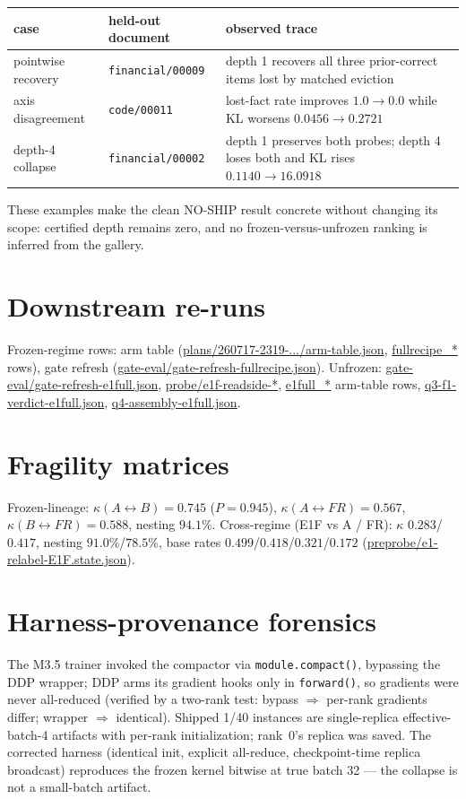 \documentclass[11pt]{article}
\begin{document}
\begin{center}
\small
\begin{tabularx}{\linewidth}{@{}llX@{}}
\toprule
case & held-out document & observed trace \\
\midrule
pointwise recovery & \texttt{financial/00009} & depth 1 recovers all three prior-correct items lost by matched eviction \\
axis disagreement & \texttt{code/00011} & lost-fact rate improves $1.0\to0.0$ while KL worsens $0.0456\to0.2721$ \\
depth-4 collapse & \texttt{financial/00002} & depth 1 preserves both probes; depth 4 loses both and KL rises $0.1140\to16.0918$ \\
\bottomrule
\end{tabularx}
\end{center}

These examples make the clean NO-SHIP result concrete without changing its
scope: certified depth remains zero, and no frozen-versus-unfrozen ranking is
inferred from the gallery.

\section{Downstream re-runs}
Frozen-regime rows: arm table
(\url{plans/260717-2319-.../arm-table.json}, \url{fullrecipe_*}
rows), gate refresh
(\url{gate-eval/gate-refresh-fullrecipe.json}). Unfrozen: \url{gate-eval/gate-refresh-e1full.json},
\url{probe/e1f-readside-*}, \url{e1full_*} arm-table rows,
\url{q3-f1-verdict-e1full.json}, \url{q4-assembly-e1full.json}.

\section{Fragility matrices}
Frozen-lineage: $\kappa(A{\leftrightarrow}B)=0.745$ ($P{=}0.945$),
$\kappa(A{\leftrightarrow}FR)=0.567$, $\kappa(B{\leftrightarrow}FR)=0.588$,
nesting $94.1\%$. Cross-regime (E1F vs A / FR): $\kappa$ $0.283$/$0.417$, nesting
$91.0\%$/$78.5\%$, base rates $0.499$/$0.418$/$0.321$/$0.172$
(\url{preprobe/e1-relabel-E1F.state.json}).

\section{Harness-provenance forensics}
The M3.5 trainer invoked the compactor via \texttt{module.compact()},
bypassing the DDP wrapper; DDP arms its gradient hooks only in
\texttt{forward()}, so gradients were never all-reduced (verified by a
two-rank test: bypass $\Rightarrow$ per-rank gradients differ; wrapper
$\Rightarrow$ identical). Shipped 1/40 instances are single-replica
effective-batch-4 artifacts with per-rank initialization; rank~0's
replica was saved. The corrected harness (identical init, explicit
all-reduce, checkpoint-time replica broadcast) reproduces the frozen
kernel bitwise at true batch 32 --- the collapse is not a small-batch
artifact.
\end{document}
